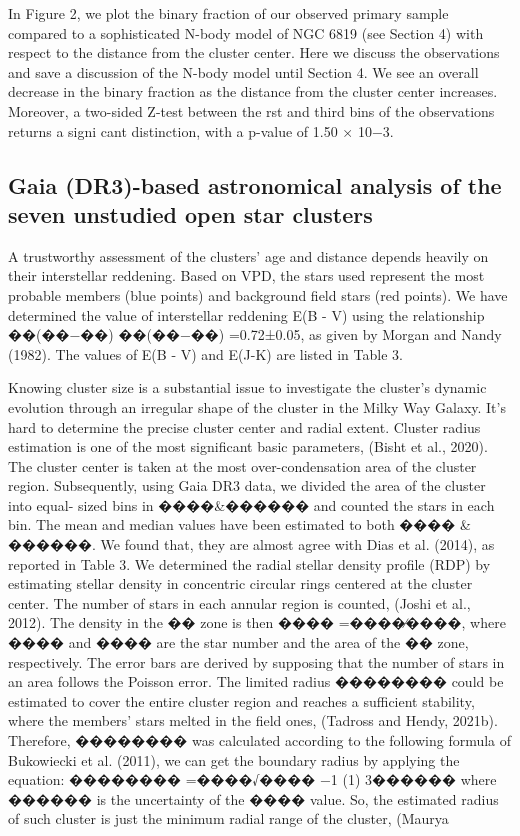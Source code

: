 \documentclass[../Main.tex]{subfiles}
\begin{document}
{In Figure 2, we plot the binary fraction of our observed
primary sample compared to a sophisticated N-body model of
NGC 6819 (see Section 4) with respect to the distance from the
cluster center. Here we discuss the observations and save a
discussion of the N-body model until Section 4. We see an
overall decrease in the binary fraction as the distance from the
cluster center increases. Moreover, a two-sided Z-test between
the rst and third bins of the observations returns a signi cant
distinction, with a p-value of 1.50 × 10−3.


\subsection{Gaia (DR3)-based astronomical analysis of the seven unstudied open star
clusters}
A trustworthy assessment of the clusters’ age and distance depends
heavily on their interstellar reddening. Based on VPD, the stars used
represent the most probable members (blue points) and background
field stars (red points). We have determined the value of interstellar
reddening E(B - V) using the relationship ��(��−��)
��(��−��) =0.72±0.05, as given
by Morgan and Nandy (1982). The values of E(B - V) and E(J-K) are
listed in Table 3.

% 

Knowing cluster size is a substantial issue to investigate the cluster’s
dynamic evolution through an irregular shape of the cluster in the
Milky Way Galaxy. It’s hard to determine the precise cluster center and
radial extent. Cluster radius estimation is one of the most significant
basic parameters, (Bisht et al., 2020). The cluster center is taken at
the most over-condensation area of the cluster region. Subsequently,
using Gaia DR3 data, we divided the area of the cluster into equal-
sized bins in ����&������ and counted the stars in each bin. The mean and
median values have been estimated to both ���� & ������. We found that,
they are almost agree with Dias et al. (2014), as reported in Table 3. We
determined the radial stellar density profile (RDP) by estimating stellar
density in concentric circular rings centered at the cluster center. The
number of stars in each annular region is counted, (Joshi et al., 2012).
The density in the �� zone is then ���� =����∕����, where ���� and ���� are the
star number and the area of the �� zone, respectively. The error bars
are derived by supposing that the number of stars in an area follows
the Poisson error. The limited radius �������� could be estimated to cover
the entire cluster region and reaches a sufficient stability, where the
members’ stars melted in the field ones, (Tadross and Hendy, 2021b).
Therefore, �������� was calculated according to the following formula
of Bukowiecki et al. (2011), we can get the boundary radius by applying
the equation:
�������� =����√����
−1 (1)
3������
where ������ is the uncertainty of the ���� value. So, the estimated radius of
such cluster is just the minimum radial range of the cluster, (Maurya

}
\end{document}
